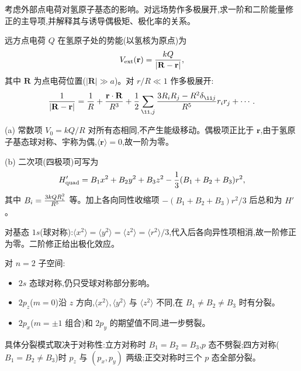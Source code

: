 \begin{question}
考虑外部点电荷对氢原子基态的影响。对远场势作多极展开,求一阶和二阶能量修正的主导项,并解释其与诱导偶极矩、极化率的关系。
\begin{solution}
远方点电荷 $Q$ 在氢原子处的势能(以氢核为原点)为
\[
V_{\rm ext}(\mathbf r) = {kQ\over|\mathbf R-\mathbf r|},
\]
其中 $\mathbf R$ 为点电荷位置($|\mathbf R|\gg a$)。对 $r/R\ll1$ 作多极展开:
\[
{1\over|\mathbf R-\mathbf r|} = {1\over R} + {\mathbf r\cdot\mathbf R\over R^3} + {1\over2}\sum_{\ii,j}{3R_iR_j-R^2\delta_{\ii j}\over R^5}r_ir_j + \cdots.
\]

(a) 常数项 $V_0=kQ/R$ 对所有态相同,不产生能级移动。偶极项正比于 $\mathbf r$,由于氢原子基态球对称、宇称为偶,$\langle\mathbf r\rangle=0$,故一阶为零。

(b) 二次项(四极项)可写为
\[
H'_{\rm quad} = B_1x^2+B_2y^2+B_3z^2 - {1\over3}(B_1+B_2+B_3)r^2,
\]
其中 $B_i = {3kQ R_i^2\over R^5}$ 等。加上各向同性收缩项 $-(B_1+B_2+B_3)r^2/3$ 后总和为 $H'$。

对基态 $1s$(球对称):$\langle x^2\rangle=\langle y^2\rangle=\langle z^2\rangle = \langle r^2\rangle/3$,代入后各向异性项相消,故一阶修正为零。二阶修正给出极化效应。

对 $n=2$ 子空间:
\begin{itemize}
\item $2s$ 态球对称,仍只受球对称部分影响。
\item $2p_z$($m=0$)沿 $z$ 方向,$\langle x^2\rangle,\langle y^2\rangle$ 与 $\langle z^2\rangle$ 不同,在 $B_1\neq B_2\neq B_3$ 时有分裂。
\item $2p_x$($m=\pm1$ 组合)和 $2p_y$ 的期望值不同,进一步劈裂。
\end{itemize}
具体分裂模式取决于对称性:立方对称时 $B_1=B_2=B_3$,$p$ 态不劈裂;四方对称($B_1=B_2\neq B_3$)时 $p_z$ 与 $(p_x,p_y)$ 两级;正交对称时三个 $p$ 态全部分裂。
\end{solution}
\end{question}

